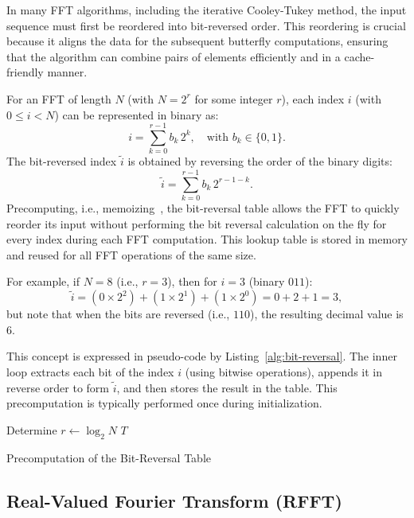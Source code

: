 \documentclass[12pt,letter]{article}
\begin{document}
In many FFT algorithms, including the iterative Cooley-Tukey method, the input
sequence must first be reordered into bit-reversed order. This reordering is
crucial because it aligns the data for the subsequent butterfly computations,
ensuring that the algorithm can combine pairs of elements efficiently and in a
cache-friendly manner.

For an FFT of length $N$ (with $N = 2^r$ for some integer $r$),
each index $i$ (with $0 \leq i < N$) can be represented in binary as:
$$
i = \sum_{k=0}^{r-1} b_k \, 2^k, \quad \text{with } b_k \in \{0,1\}.
$$
The bit-reversed index $\tilde{i}$ is obtained by reversing the order of
the binary digits:
$$
\tilde{i} = \sum_{k=0}^{r-1} b_k \, 2^{r-1-k}.
$$
Precomputing, i.e., memoizing~\citep{cormen2009introduction}, the
bit-reversal table allows the FFT to quickly reorder its input without
performing the bit reversal calculation on the fly for every index during
each FFT computation. This lookup table is stored in memory and reused for
all FFT operations of the same size.

For example, if $N = 8$ (i.e., $r = 3$), then for $i = 3$
(binary $011$):
$$
\tilde{i} = (0 \times 2^2) + (1 \times 2^1) + (1 \times 2^0) = 0 + 2 + 1 = 3,
$$
but note that when the bits are reversed (i.e., $110$), the resulting
decimal value is 6.

This concept is expressed in pseudo-code by Listing~\ref{alg:bit-reversal}.
The inner loop extracts each bit of the index $i$ (using bitwise
operations), appends it in reverse order to form $\tilde{i}$, and then
stores the result in the table. This precomputation is typically performed
once during initialization.

\begin{algorithm}[H]
\SetAlgoLined
{}
Determine $r \gets \log_2 N$\;
\Return $T$\;
\caption{Precomputation of the Bit-Reversal Table}
\label{alg:bit-reversal}
\end{algorithm}

\subsection{Real-Valued Fourier Transform (RFFT)}
\end{document}
